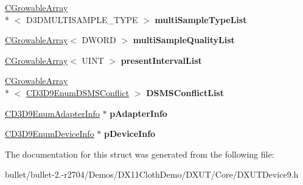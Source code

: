 \begin{DoxyCompactItemize}
\item 
\hypertarget{struct_c_d3_d9_enum_device_settings_combo_ad2cc594cde749c846d21408a166fc077}{\hyperlink{class_c_growable_array}{C\+Growable\+Array}\\*
$<$ D3\+D\+M\+U\+L\+T\+I\+S\+A\+M\+P\+L\+E\+\_\+\+T\+Y\+P\+E $>$ {\bfseries multi\+Sample\+Type\+List}}\label{struct_c_d3_d9_enum_device_settings_combo_ad2cc594cde749c846d21408a166fc077}

\item 
\hypertarget{struct_c_d3_d9_enum_device_settings_combo_afc99e443eab0ee7b042c3b1a2553830a}{\hyperlink{class_c_growable_array}{C\+Growable\+Array}$<$ D\+W\+O\+R\+D $>$ {\bfseries multi\+Sample\+Quality\+List}}\label{struct_c_d3_d9_enum_device_settings_combo_afc99e443eab0ee7b042c3b1a2553830a}

\item 
\hypertarget{struct_c_d3_d9_enum_device_settings_combo_a51055b5c7e4b7f19a320f653297382dd}{\hyperlink{class_c_growable_array}{C\+Growable\+Array}$<$ U\+I\+N\+T $>$ {\bfseries present\+Interval\+List}}\label{struct_c_d3_d9_enum_device_settings_combo_a51055b5c7e4b7f19a320f653297382dd}

\item 
\hypertarget{struct_c_d3_d9_enum_device_settings_combo_ab73ae6a2b08cc8b465a10d6ac1f2dc37}{\hyperlink{class_c_growable_array}{C\+Growable\+Array}\\*
$<$ \hyperlink{struct_c_d3_d9_enum_d_s_m_s_conflict}{C\+D3\+D9\+Enum\+D\+S\+M\+S\+Conflict} $>$ {\bfseries D\+S\+M\+S\+Conflict\+List}}\label{struct_c_d3_d9_enum_device_settings_combo_ab73ae6a2b08cc8b465a10d6ac1f2dc37}

\item 
\hypertarget{struct_c_d3_d9_enum_device_settings_combo_a16d48ae2a8f3afcd11270d3a06c30b4b}{\hyperlink{class_c_d3_d9_enum_adapter_info}{C\+D3\+D9\+Enum\+Adapter\+Info} $\ast$ {\bfseries p\+Adapter\+Info}}\label{struct_c_d3_d9_enum_device_settings_combo_a16d48ae2a8f3afcd11270d3a06c30b4b}

\item 
\hypertarget{struct_c_d3_d9_enum_device_settings_combo_a0909ed806b9e746fe09bfe480e9f589d}{\hyperlink{class_c_d3_d9_enum_device_info}{C\+D3\+D9\+Enum\+Device\+Info} $\ast$ {\bfseries p\+Device\+Info}}\label{struct_c_d3_d9_enum_device_settings_combo_a0909ed806b9e746fe09bfe480e9f589d}

\end{DoxyCompactItemize}


The documentation for this struct was generated from the following file\+:\begin{DoxyCompactItemize}
\item 
bullet/bullet-\/2.-\/r2704/\+Demos/\+D\+X11\+Cloth\+Demo/\+D\+X\+U\+T/\+Core/D\+X\+U\+T\+Device9.\+h\end{DoxyCompactItemize}
